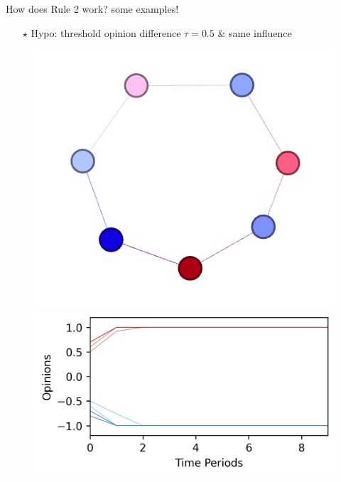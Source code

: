 \documentclass[xcolor=table,handout]{beamer}
\begin{document}
%
\begin{frame}{How does Rule 2 work? some examples! }
\begin{itemize} \item[$\star$] Hypo: threshold opinion difference $\tau = 0.5$ \& same influence \end{itemize}
\begin{figure}
\centering
\begin{minipage}{.5\textwidth}
  \centering
  \includegraphics[scale = 0.55]{./img/ideo_opp_1.png}
\end{minipage}%
\begin{minipage}{.5\textwidth}
  \centering
  \includegraphics[scale = 0.55]{./img/plot_ideo_opposed.jpg}
\end{minipage}
\end{figure}

\end{frame}
\end{document}
